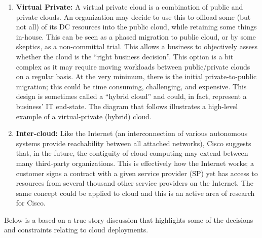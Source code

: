 \begin{enumerate}
  \item \textbf{Virtual Private:} A virtual private cloud is a combination of
  public and private clouds. An organization may decide to use this to offload
  some (but not all) of its DC resources into the public cloud, while
  retaining some things in-house. This can be seen as a phased migration to
  public cloud, or by some skeptics, as a non-committal trial. This allows a
  business to objectively assess whether the cloud is the ``right business
  decision''. This option is a bit complex as it may require moving workloads
  between public/private clouds on a regular basis. At the very minimum, there
  is the initial private-to-public migration; this could be time consuming,
  challenging, and expensive. This design is sometimes called a ``hybrid cloud''
  and could, in fact, represent a business’ IT end-state. The diagram that
  follows illustrates a high-level example of a virtual-private (hybrid) cloud.


  \item \textbf{Inter-cloud:} Like the Internet (an interconnection of various
  autonomous systems provide reachability between all attached networks),
  Cisco suggests that, in the future, the contiguity of cloud computing may
  extend between many third-party organizations. This is effectively how the
  Internet works; a customer signs a contract with a given service provider
  (SP) yet has access to resources from several thousand other service
  providers on the Internet. The same concept could be applied to cloud and
  this is an active area of research for Cisco.
\end{enumerate}

Below is a based-on-a-true-story discussion that highlights some of the
decisions and constraints relating to cloud deployments.

